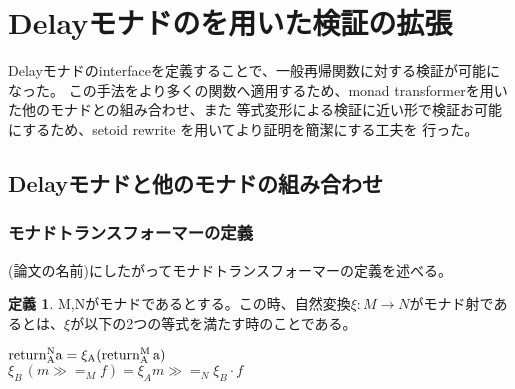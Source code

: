 \documentclass[japanese]{jssst_ppl}
\theoremstyle{definition}
\newtheorem{definition}[theorem]{定義}
\newcommand{\ret}{\rm{return}}
\newcommand{\binds}{ \gg = }
\begin{document}
\iffalse
  \begin{verbatim}
  HB.mixin Record isMonadDelay (M : UU0 -> UU0) of Monad M := {
  while : forall {A B : UU0}, (A -> M(B + A)%type) -> A ->M B;
  wBisim: forall {A : UU0}, M A -> M A -> Prop;
  wBisim_refl: forall A (a: M A), wBisim a a;
  wBisim_sym: forall A (a b: M A), wBisim a b -> wBisim b a;
  wBisim_trans: forall A (a b c: M A), wBisim a b -> wBisim b c -> wBisim a c;
  fixpointE: forall (A B : UU0) (f: A -> M (B + A)%type) (a: A),
  wBisim (while f a) ((f a) >>= (sum_rect (fun => M B ) (@ret M B) (while f)));
  naturalityE: forall (A B C : UU0) (f: A -> M (B + A)%type) (g: B -> M C) (a: A),
  wBisim ((while f a) >>= g)(while (fun y => (f y) >>= (sum_rect (fun => M (C + A)%type) (M # inl \o g) (M # inr \o (@ret M A )) ) ) a);
  codiagonalE:forall (A B : UU0) (f: A -> M ((B + A) + A)%type) (a: A),
  wBisim (while ((M # ((sum_rect (fun => (B + A)%type) idfun inr)))  \o f ) a) (while (while f) a);
  bindmwB: forall (A B: UU0) (f: A -> M B)(d1 d2: M A),
  wBisim d1 d2 -> wBisim (d1 >>= f) (d2>>= f);
  bindfwB: forall (A B: UU0) (f g: A -> M B)(d: M A),
  (forall a, wBisim (f a) (g a)) -> wBisim (d >>= f) (d >>= g);
  whilewB: forall (A B : UU0) (f g: A -> M ((B + A))%type) (a: A),
  (forall a, wBisim (f a) (g a)) -> wBisim (while f a) (while g a);
  }.
        \end{verbatim}

\fi

\section{Delayモナドのを用いた検証の拡張}
Delayモナドのinterfaceを定義することで、一般再帰関数に対する検証が可能になった。
この手法をより多くの関数へ適用するため、monad transformerを用いた他のモナドとの組み合わせ、また
等式変形による検証に近い形で検証お可能にするため、setoid rewrite を用いてより証明を簡潔にする工夫を
行った。

\subsection{Delayモナドと他のモナドの組み合わせ}
\subsubsection{モナドトランスフォーマーの定義}
(論文の名前)にしたがってモナドトランスフォーマーの定義を述べる。


\begin{definition}
  M,Nがモナドであるとする。この時、自然変換$\xi: M \to N$がモナド射であるとは、$\xi$が以下の2つの等式を満たす時のことである。
  \begin{center}
    $ \ret_A^N a = \xi_A (\ret_A^M \, a)$ \\
    $ \xi_B \,(m \binds_M f) = \xi_A m \binds_N \xi_B \cdot f $ \\
  \end{center}
\end{definition}
\end{document}
